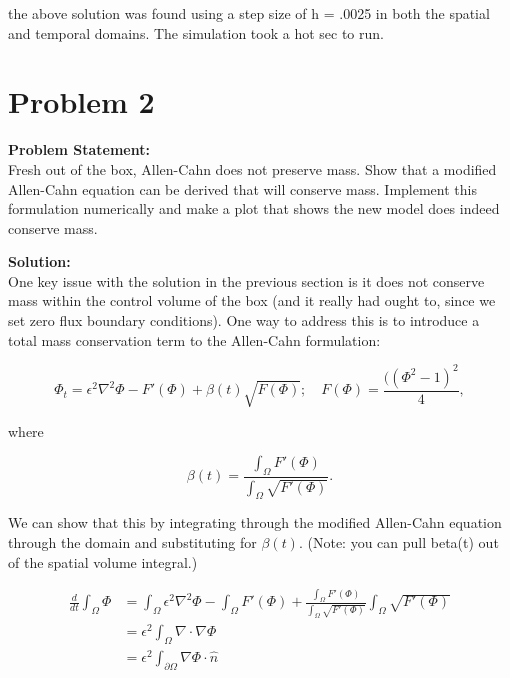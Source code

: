 \documentclass[12pt]{article}
\begin{document}
    the above solution was found using a step size of h = .0025 in both the spatial and temporal domains. The simulation took a hot sec to run.
    
\newpage
\section{Problem 2}
 \begin{tcolorbox}
        \textbf{Problem Statement:}\\
        Fresh out of the box, Allen-Cahn does not preserve mass. Show that a modified Allen-Cahn equation can be derived that will conserve mass. Implement this formulation numerically and make a plot that shows the new model does indeed conserve mass.        
    \end{tcolorbox}
    
    \textbf{Solution:}\\
        One key issue with the solution in the previous section is it does not conserve mass within the control volume of the box (and it really had ought to, since we set zero flux boundary conditions). One way to address this is to introduce a total mass conservation term to the Allen-Cahn formulation:

        \begin{equation}
            \Phi_t = \epsilon^2 \nabla^2 \Phi - F'(\Phi) + \beta(t)\sqrt{F(\Phi)}; \quad F(\Phi) = \frac{((\Phi^2-1)^2}{4},
        \end{equation}

        where
        
        \begin{equation}
            \beta(t) = \frac{\int_\Omega F'(\Phi)}{\int_\Omega \sqrt{F'(\Phi)}}.
        \end{equation}

        We can show that this  by integrating through the modified Allen-Cahn equation through the domain and substituting for $\beta(t)$. (Note: you can pull beta(t) out of the spatial volume integral.)

        \begin{align}
            \frac{d}{dt}\int_\Omega \Phi &= \int_\Omega \epsilon^2\nabla^2\Phi - \int_\Omega F'(\Phi) + \frac{\int_\Omega F'(\Phi)}{\int_\Omega \sqrt{F'(\Phi)}}\int_\Omega \sqrt{F'(\Phi)} \\
            &= \epsilon^2\int_\Omega \nabla \cdot \nabla \Phi \\
            &= \epsilon^2 \int_{\partial\Omega} \nabla \Phi \cdot \hat{n}
        \end{align}
    
\end{document}
